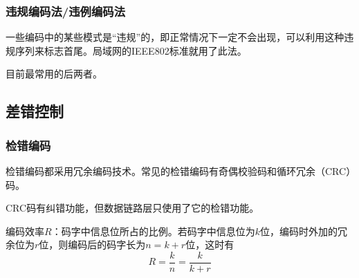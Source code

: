 \documentclass[12pt, a4paper, oneside]{ctexart}
\begin{document}
\subsubsection{违规编码法/违例编码法}

一些编码中的某些模式是“违规”的，即正常情况下一定不会出现，可以利用这种违规序列来标志首尾。局域网的IEEE802标准就用了此法。

目前最常用的后两者。

\subsection{差错控制}

\subsubsection{检错编码}

检错编码都采用冗余编码技术。常见的检错编码有奇偶校验码和循环冗余（CRC）码。

CRC码有纠错功能，但数据链路层只使用了它的检错功能。

编码效率$R$：码字中信息位所占的比例。若码字中信息位为$k$位，编码时外加的冗余位为$r$位，则编码后的码字长为$n=k+r$位，这时有
\begin{equation*}
    R=\frac{k}{n}=\frac{k}{k+r}
\end{equation*}
\end{document}
